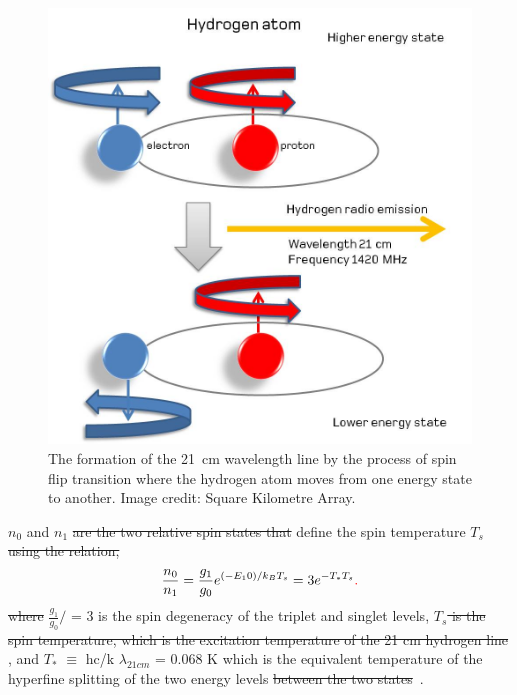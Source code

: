 	\begin{figure}
		\begin{center}
			\includegraphics[width=0.5\linewidth]{Figures/Hydrogenemission1.jpeg}
			\caption{The formation of the \SI{21}{cm} wavelength line by the process of  spin flip transition where the hydrogen atom moves from one energy state to another. Image credit: {Square Kilometre Array}.}
			\label{Fig:21cm}
		\end{center}
	\end{figure}
	
	 $n_0$ and $n_1$\attention{,} \st{are the two relative spin states that} define the spin temperature $T_s$\attention{:} \st{using the relation,}
	\begin{equation}
	\frac{n_0}{n_1} = \frac{g_1}{g_0}e^{(-E_10)/{k_B}{T_s}} = 3e^{{-T_*}{T_s}}\textcolor{red}{\bf {.}}
	\end{equation}
	\st{where}  $\frac{g_1}{g_0}/$ = 3  is the spin degeneracy of the triplet and singlet levels, \st{$T_s$ is the spin temperature, which is the excitation temperature of the 21 cm hydrogen line} , and $T_{*}$ $\equiv$ hc/k $\lambda_{21cm}$ = 0.068 K  which is the equivalent temperature of the hyperfine splitting of the two energy levels \st{between the two states}~\citep{2012RPPh...75h6901P}.
	
